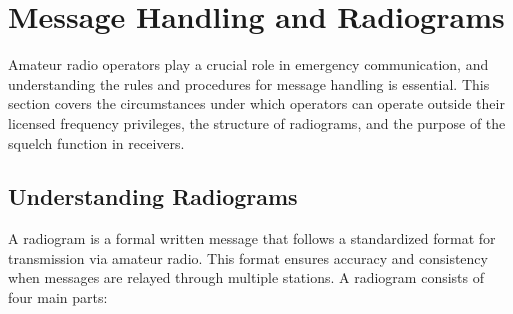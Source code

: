 \section{Message Handling and Radiograms}
\label{section:message_handling}

Amateur radio operators play a crucial role in emergency communication, and understanding the rules and procedures for message handling is essential. This section covers the circumstances under which operators can operate outside their licensed frequency privileges, the structure of radiograms, and the purpose of the squelch function in receivers.


\subsection*{Understanding Radiograms}
A radiogram is a formal written message that follows a standardized format for transmission via amateur radio. This format ensures accuracy and consistency when messages are relayed through multiple stations. A radiogram consists of four main parts:

